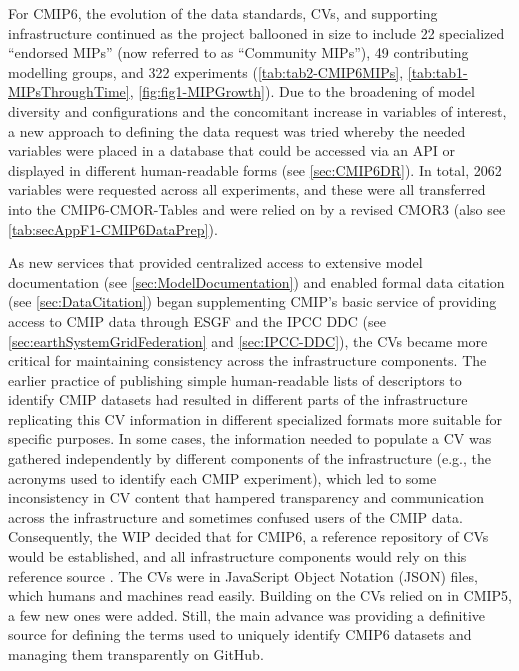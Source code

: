 \documentclass[manuscript]{copernicus}
\begin{document}
For CMIP6, the evolution of the data standards, CVs, and supporting infrastructure continued as the project ballooned in size to include 22 specialized ``endorsed MIPs'' (now referred to as ``Community MIPs''), 49 contributing modelling groups, and 322 experiments (\autoref{tab:tab2-CMIP6MIPs}, \autoref{tab:tab1-MIPsThroughTime}, \autoref{fig:fig1-MIPGrowth}). Due to the broadening of model diversity and configurations and the concomitant increase in variables of interest, a new approach to defining the data request was tried whereby the needed variables were placed in a database that could be accessed via an API or displayed in different human-readable forms (see \autoref{sec:CMIP6DR}). In total, 2062 variables were requested across all experiments, and these were all transferred into the CMIP6-CMOR-Tables \citep{nadeau_cmip6_2017} and were relied on by a revised CMOR3 \citep{mauzey_cmor_2024} (also see \autoref{tab:secAppF1-CMIP6DataPrep}).

As new services that provided centralized access to extensive model documentation (see \autoref{sec:ModelDocumentation}) and enabled formal data citation (see \autoref{sec:DataCitation}) began supplementing CMIP's basic service of providing access to CMIP data through ESGF and the IPCC DDC (see \autoref{sec:earthSystemGridFederation} and \autoref{sec:IPCC-DDC}), the CVs became more critical for maintaining consistency across the infrastructure components. The earlier practice of publishing simple human-readable lists of descriptors to identify CMIP datasets had resulted in different parts of the infrastructure replicating this CV information in different specialized formats more suitable for specific purposes. In some cases, the information needed to populate a CV was gathered independently by different components of the infrastructure (e.g., the acronyms used to identify each CMIP experiment), which led to some inconsistency in CV content that hampered transparency and communication across the infrastructure and sometimes confused users of the CMIP data. Consequently, the WIP decided that for CMIP6, a reference repository of CVs would be established, and all infrastructure components would rely on this reference source \citep{durack_cmip6_2024}. The CVs were in JavaScript Object Notation (JSON) files, which humans and machines read easily. Building on the CVs relied on in CMIP5, a few new ones were added. Still, the main advance was providing a definitive source for defining the terms used to uniquely identify CMIP6 datasets and managing them transparently on GitHub.
\end{document}
